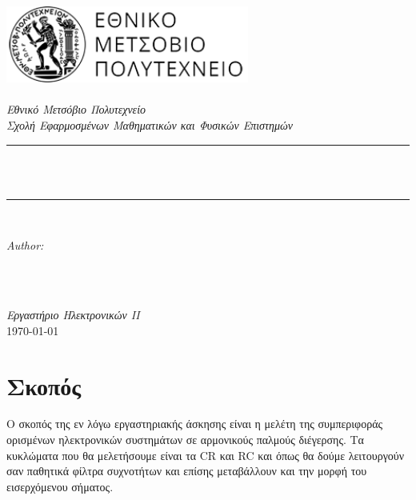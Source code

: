 \documentclass[a4paper]{article}
\begin{document}
\begin{titlepage}




\newcommand{\HRule}{\rule{\linewidth}{0.5mm}}
\includegraphics[width=8cm]{logo1.png}\\[1cm] 
\center 
\quad\\[1.5cm]
\textsl{\Large Εθνικό Μετσόβιο Πολυτεχνείο}\\[0.5cm] 
\textsl{\large Σχολή Εφαρμοσμένων Μαθηματικών και Φυσικών Επιστημών}\\[0.5cm] 
\makeatletter
\HRule \\[0.4cm]
{ \huge \bfseries \@title}\\[0.4cm] 
\HRule \\[1.5cm]
\begin{minipage}{0.4\textwidth}
\begin{flushleft} \large
\emph{Author:}\\
\@author 
\end{flushleft}
\end{minipage}
~
\begin{minipage}{0.4\textwidth}
\begin{flushright} \large

\end{flushright}
\end{minipage}\\[3cm]
\makeatother
{\large \emph{Εργαστήριο Ηλεκτρονικών ΙΙ}}\\[0.5cm]
{\large \today}\\[2cm] 
\vfill 



\end{titlepage}

\section*{Σκοπός}
	Ο σκοπός της εν λόγω εργαστηριακής άσκησης είναι η μελέτη της συμπεριφοράς ορισμένων ηλεκτρονικών συστημάτων σε αρμονικούς παλμούς διέγερσης. Τα κυκλώματα που θα μελετήσουμε είναι τα CR και RC και όπως θα δούμε λειτουργούν σαν παθητικά φίλτρα συχνοτήτων και επίσης μεταβάλλουν και την μορφή του εισερχόμενου σήματος.
	
\end{document}
